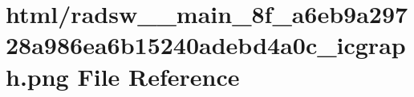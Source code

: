 \hypertarget{radsw____main__8f__a6eb9a29728a986ea6b15240adebd4a0c__icgraph_8png}{}\section{html/radsw\+\_\+\+\_\+main\+\_\+8f\+\_\+a6eb9a29728a986ea6b15240adebd4a0c\+\_\+icgraph.png File Reference}
\label{radsw____main__8f__a6eb9a29728a986ea6b15240adebd4a0c__icgraph_8png}
